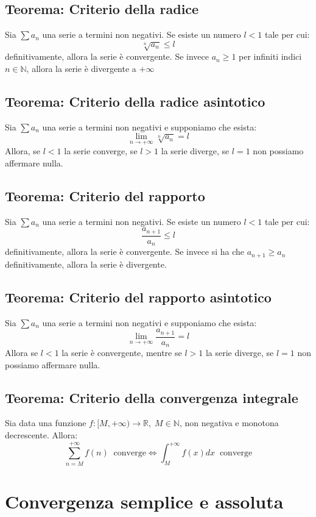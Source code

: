 \documentclass[a4paper,12pt,openright]{book}
\begin{document}
	\subsection{Teorema: Criterio della radice}
	Sia $\sum a_n$ una serie a termini non negativi. Se esiste un numero $l < 1$ tale per cui:
	\[\sqrt[n]{a_n} \leq l\]
	definitivamente, allora la serie è convergente. Se invece $a_n \geq 1$ per infiniti indici $n \in \mathbb{N}$, allora la serie è divergente a $+ \infty$
	
	\subsection{Teorema: Criterio della radice asintotico}
	Sia $\sum a_n$ una serie a termini non negativi e supponiamo che esista:
	\[\lim_{n \to +\infty} \sqrt[n]{a_n} = l\]
	Allora, se $l < 1$ la serie converge, se $l > 1$ la serie diverge, se $l = 1$ non possiamo affermare nulla.
	
	\subsection{Teorema: Criterio del rapporto}
	Sia $\sum a_n$ una serie a termini non negativi. Se esiste un numero $l < 1$ tale per cui:
	\[\frac{a_{n + 1}}{a_n} \leq l\]
	definitivamente, allora la serie è convergente. Se invece si ha che $a_{n + 1} \geq a_n$ definitivamente, allora la serie è divergente.
	
	\subsection{Teorema: Criterio del rapporto asintotico}
	Sia $\sum a_n$ una serie a termini non negativi e supponiamo che esista:
	\[\lim_{n \to +\infty} \frac{a_{n + 1}}{a_n} = l\]
	Allora se $l < 1$ la serie è convergente, mentre se $l > 1$ la serie diverge, se $l = 1$ non possiamo affermare nulla.
	
	\subsection{Teorema: Criterio della convergenza integrale}
	Sia data una funzione $f: [M, +\infty) \longrightarrow \mathbb{R}, \; M \in \mathbb{N}$, non negativa e monotona decrescente. Allora:
	\[\sum_{n = M}^{+\infty} f(n) \; \; \mathrm{converge} \iff \int_{M}^{+\infty} f(x)dx \; \; \mathrm{converge}\]
	
	\section{Convergenza semplice e assoluta}
\end{document}
